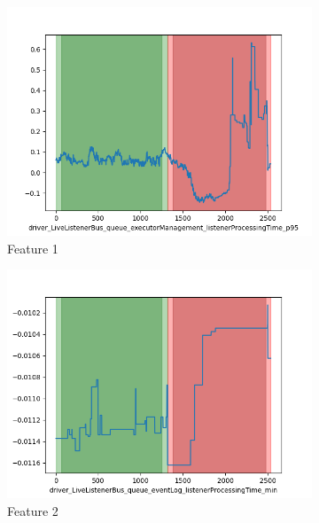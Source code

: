 \documentclass[oneside, a4paper, onecolumn, 11pt]{article}
\begin{document}
\begin{figure}[H]
  \centering
  \begin{subfigure}{0.30\textwidth}
      \centering
      \includegraphics[width=\linewidth]{images/plotduo1111.png}
      \caption{Feature 1}
  \end{subfigure}
  \begin{subfigure}{0.30\textwidth}
      \centering
      \includegraphics[width=\linewidth]{images/plotduo2222.png}
      \caption{Feature 2}
  \end{subfigure}
  \begin{subfigure}{0.30\textwidth}
    \centering

\end{subfigure}
\end{figure}
\end{document}
